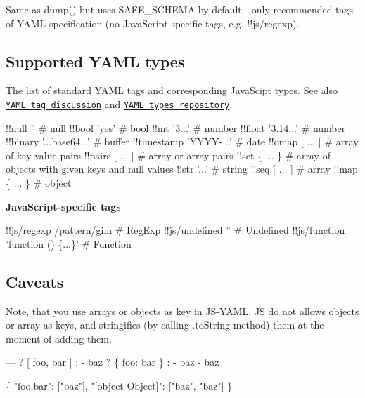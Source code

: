 Same as {\ttfamily dump()} but uses {\ttfamily S\+A\+F\+E\+\_\+\+S\+C\+H\+E\+MA} by default -\/ only recommended tags of Y\+A\+ML specification (no Java\+Script-\/specific tags, e.\+g. {\ttfamily !!js/regexp}).

\subsection*{Supported Y\+A\+ML types }

The list of standard Y\+A\+ML tags and corresponding Java\+Scipt types. See also \href{http://pyyaml.org/wiki/YAMLTagDiscussion}{\tt Y\+A\+ML tag discussion} and \href{http://yaml.org/type/}{\tt Y\+A\+ML types repository}.


\begin{DoxyCode}
!!null ''                   # null
!!bool 'yes'                # bool
!!int '3...'                # number
!!float '3.14...'           # number
!!binary '...base64...'     # buffer
!!timestamp 'YYYY-...'      # date
!!omap [ ... ]              # array of key-value pairs
!!pairs [ ... ]             # array or array pairs
!!set \{ ... \}               # array of objects with given keys and null values
!!str '...'                 # string
!!seq [ ... ]               # array
!!map \{ ... \}               # object
\end{DoxyCode}


{\bfseries Java\+Script-\/specific tags}


\begin{DoxyCode}
!!js/regexp /pattern/gim            # RegExp
!!js/undefined ''                   # Undefined
!!js/function 'function () \{...\}'   # Function
\end{DoxyCode}


\subsection*{Caveats}

Note, that you use arrays or objects as key in J\+S-\/\+Y\+A\+ML. JS do not allows objects or array as keys, and stringifies (by calling .to\+String method) them at the moment of adding them.


\begin{DoxyCode}
---
? [ foo, bar ]
: - baz
? \{ foo: bar \}
: - baz
  - baz
\end{DoxyCode}



\begin{DoxyCode}
\{ "foo,bar": ["baz"], "[object Object]": ["baz", "baz"] \}
\end{DoxyCode}


